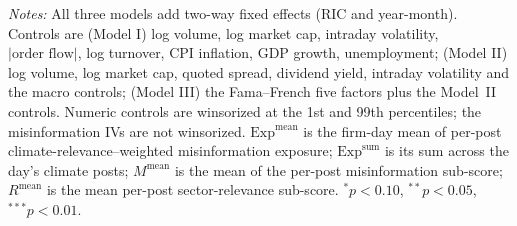 \begin{table}[htbp]
\begin{threeparttable}
\begin{tablenotes}
\item \textit{Notes:} All three models add two-way fixed effects (RIC and year-month).
Controls are (Model I) log volume, log market cap, intraday volatility, $|\text{order flow}|$,
log turnover, CPI inflation, GDP growth, unemployment; (Model II) log volume, log market cap,
quoted spread, dividend yield, intraday volatility and the macro controls; (Model III) the
Fama--French five factors plus the Model~II controls. Numeric controls are winsorized at the
1st and 99th percentiles; the misinformation IVs are not winsorized. $\mathrm{Exp}^{\text{mean}}$
is the firm-day mean of per-post climate-relevance--weighted misinformation exposure;
$\mathrm{Exp}^{\text{sum}}$ is its sum across the day's climate posts;
$M^{\text{mean}}$ is the mean of the per-post misinformation sub-score;
$R^{\text{mean}}$ is the mean per-post sector-relevance sub-score.
$^{*}p<0.10$, $^{**}p<0.05$, $^{***}p<0.01$.
\end{tablenotes}
\end{threeparttable}
\end{table}